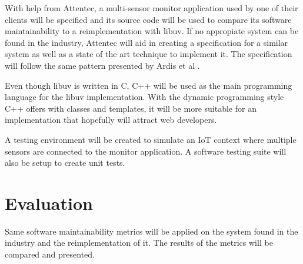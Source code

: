 With help from Attentec, a multi-sensor monitor application used by one of
their clients will be specified and its source code will be used to compare its
software maintainability to a reimplementation with libuv. If no appropiate
system can be found in the industry, Attentec will aid in creating a
specification for a similar system as well as a state of the art technique to
implement it. The specification will follow the same pattern presented by Ardis
et al \cite{ardis1996framework}.

Even though libuv is written in C, C++ will be used as the main programming
language for the libuv implementation. With the dynamic programming style C++
offers with classes and templates, it will be more suitable for an
implementation that hopefully will attract web developers.

A testing environment will be created to simulate an IoT context where multiple
sensors are connected to the monitor application. A software testing suite will
also be setup to create unit tests.

\section{Evaluation}

Same software maintainability metrics will be applied on the system found in
the industry and the reimplementation of it. The results of the metrics will be
compared and presented.
